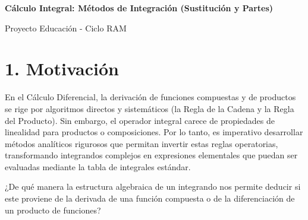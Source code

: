 \documentclass[11pt]{article}
\newenvironment{motivacion}{\section*{1. Motivación}}{}
\newenvironment{preguntaguia}{\begin{tcolorbox}[colback=cyan!5,colframe=cyan!75!black,title=Pregunta Guía]}{\end{tcolorbox}}
\begin{document}
\begin{center}
  {\Large \textbf{Cálculo Integral: Métodos de Integración (Sustitución y Partes)}}\par
  \vspace{0.5em}
  {\normalsize Proyecto Educación - Ciclo RAM}\par
  \vspace{1em}
\end{center}

\begin{motivacion}
  En el Cálculo Diferencial, la derivación de funciones compuestas y de productos se rige por algoritmos directos y sistemáticos (la Regla de la Cadena y la Regla del Producto). Sin embargo, el operador integral carece de propiedades de linealidad para productos o composiciones. Por lo tanto, es imperativo desarrollar métodos analíticos rigurosos que permitan invertir estas reglas operatorias, transformando integrandos complejos en expresiones elementales que puedan ser evaluadas mediante la tabla de integrales estándar.

  \begin{preguntaguia}
    ¿De qué manera la estructura algebraica de un integrando nos permite deducir si este proviene de la derivada de una función compuesta o de la diferenciación de un producto de funciones?
  \end{preguntaguia}
\end{motivacion}
\end{document}
